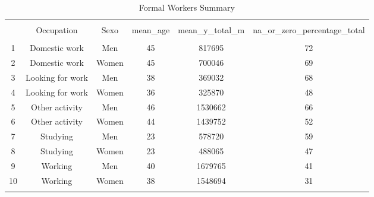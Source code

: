 
\begin{table}[!htbp] \centering 
  \caption{Formal Workers Summary} 
  \label{tab:formal_workers} 
\begin{tabular}{@{\extracolsep{5pt}} cccccc} 
\\[-1.8ex]\hline 
\hline \\[-1.8ex] 
 & Occupation & Sexo & mean\_age & mean\_y\_total\_m & na\_or\_zero\_percentage\_total \\ 
\hline \\[-1.8ex] 
1 & Domestic work & Men & 45 & 817695 & 72 \\ 
2 & Domestic work & Women & 45 & 700046 & 69 \\ 
3 & Looking for work & Men & 38 & 369032 & 68 \\ 
4 & Looking for work & Women & 36 & 325870 & 48 \\ 
5 & Other activity & Men & 46 & 1530662 & 66 \\ 
6 & Other activity & Women & 44 & 1439752 & 52 \\ 
7 & Studying & Men & 23 & 578720 & 59 \\ 
8 & Studying & Women & 23 & 488065 & 47 \\ 
9 & Working & Men & 40 & 1679765 & 41 \\ 
10 & Working & Women & 38 & 1548694 & 31 \\ 
\hline \\[-1.8ex] 
\end{tabular} 
\end{table} 
